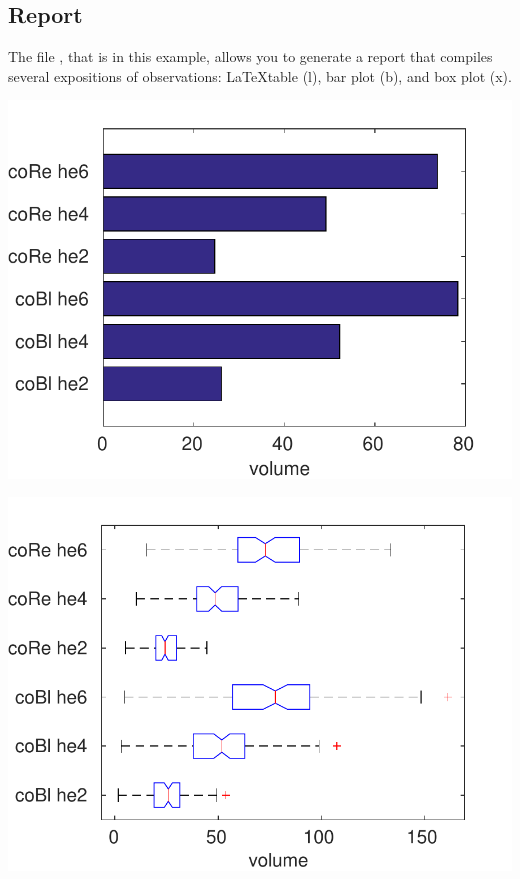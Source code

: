 \documentclass[a4paper,fleqn]{tufte-handout}
\newcommand{\latex}{\LaTeX\ }
\begin{document}
\subsection{Report}

\begin{margintable}
\caption{\latex table output.}

\end{margintable}

The file , that is  in this example, allows you to generate a report that compiles several expositions of observations: \LaTeX table (l), bar plot (b), and box plot (x).



\begin{marginfigure}
\includegraphics[width=\textwidth]{../demo/geometricShape/report/figures/geob}
\end{marginfigure}


\begin{marginfigure}
\includegraphics[width=\textwidth]{../demo/geometricShape/report/figures/geox}
\end{marginfigure}
\end{document}
